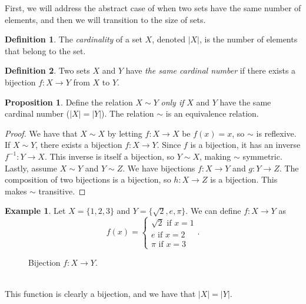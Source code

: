 \documentclass{article}
\theoremstyle{definition}
\newtheorem{proposition}{Proposition}[section]
\newtheorem{definition}{Definition}[section]
\newtheorem{example}{Example}[section]
\begin{document}
	First, we will address the abstract case of when two sets have the same number of elements, and then we will transition to the size of sets.
	\begin{definition}\label{def1.20}
		The \textit{\color{red}cardinality} of a set $ X $, denoted $ |X| $, is the number of elements that belong to the set.   
	\end{definition} 
	\begin{definition}\label{def1.21}
		Two sets $ X $ and $ Y $ have \textit{\color{red}the same cardinal number} if there exists a bijection $ f:X\to Y $ from $ X $ to $ Y $.  
	\end{definition} 
	\begin{proposition}
		Define the relation $ X\sim Y $ \textit{only if} $ X $ and $ Y $ have the same cardinal number ($ |X|=|Y| $). The relation $ \sim $ is an equivalence relation. 
	\end{proposition} 
	\begin{proof}
		We have that $ X\sim X $ by letting $ f:X\to X $ be $ f(x)=x $, so $ \sim $ is reflexive. If $ X\sim Y $, there exists a bijection $ f:X\to Y $. Since $ f $ is a bijection, it has an inverse $ f^{-1}:Y\to X $. This inverse is itself a bijection, so $ Y\sim X $, making $ \sim $ symmetric. Lastly, assume $ X\sim Y $ and $ Y\sim Z $. We have bijections $ f:X\to Y $ and $ g:Y\to Z $. The composition of two bijections is a bijection, so $ h:X\to Z $ is a bijection. This makes $ \sim $ transitive.  
	\end{proof}
	\begin{example}
		Let $ X=\{1,2,3\} $ and $ Y=\{\sqrt{2},e,\pi\} $. We can define $ f:X\to Y $ as $$ f(x)=\begin{cases}
			\sqrt{2}\text{ if }x=1\\e\text{ if }x=2\\\pi\text{ if }x=3
		\end{cases}.$$
		\begin{figure}[h!]
			\centering
			\caption{Bijection $ f:X\to Y $.}
		\end{figure}  \\
		This function is clearly a bijection, and we have that $ |X|=|Y| $.
	\end{example} 
\end{document}
